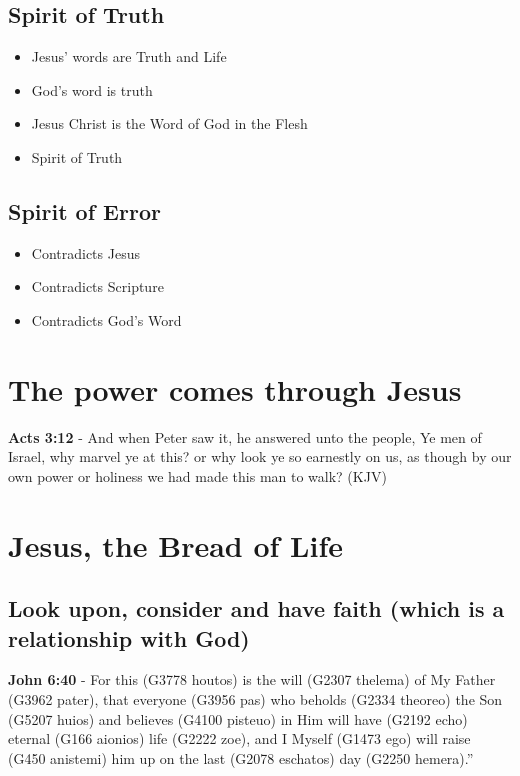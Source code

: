 \documentclass[11pt]{article}
\begin{document}
\subsection{Spirit of Truth}
\label{sec:org5d8abec}
\begin{itemize}
\item Jesus' words are Truth and Life
\item God's word is truth
\item Jesus Christ is the Word of God in the Flesh
\item Spirit of Truth
\end{itemize}

\subsection{Spirit of Error}
\label{sec:org58716ec}
\begin{itemize}
\item Contradicts Jesus
\item Contradicts Scripture
\item Contradicts God's Word
\end{itemize}

\section{The power comes through Jesus}
\label{sec:org2e9e0bb}
\textbf{Acts 3:12} - And when Peter saw it, he answered unto the people, Ye men of Israel, why marvel ye at this? or why look ye so earnestly on us, as though by our own power or holiness we had made this man to walk? (KJV)

\section{Jesus, the Bread of Life}
\label{sec:org0898d15}
\subsection{Look upon, consider and have faith (which is a relationship with God)}
\label{sec:orgba6b1ec}
\textbf{John 6:40} - For this (G3778 houtos) is the will (G2307 thelema) of My Father (G3962 pater), that everyone (G3956 pas) who beholds (G2334 theoreo) the Son (G5207 huios) and believes (G4100 pisteuo) in Him will have (G2192 echo) eternal (G166 aionios) life (G2222 zoe), and I Myself (G1473 ego) will raise (G450 anistemi) him up on the last (G2078 eschatos) day (G2250 hemera).”
\end{document}
